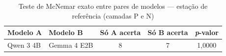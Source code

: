 \begin{table}[htbp!]
\centering
\caption{Teste de McNemar exato entre pares de modelos --- estação de referência (camadas P e N)}
\label{tab:mcnemar_estacao}
\small
\begin{tabular}{|l|l|c|c|c|}
\hline
\textbf{Modelo A} & \textbf{Modelo B} & \textbf{Só A acerta} & \textbf{Só B acerta} & \textbf{\textit{p}-valor} \\
\hline
Qwen 3 4B & Gemma 4 E2B & 8 & 7 & 1,0000 \\
\hline
\end{tabular}
\end{table}
